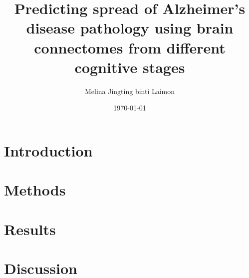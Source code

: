 \documentclass[11pt,a4paper]{article}
\title{Predicting spread of Alzheimer’s disease pathology using brain  connectomes from different cognitive stages}
\author{Melina Jingting binti Laimon}
\date{\today}
\begin{document}
\maketitle
\begin{abstract}
    
\end{abstract}

\section{Introduction}
\label{sec:Introduction}



\section{Methods}
\label{sec:Methods}




\section{Results}
\label{Results}



\section{Discussion}
\label{sec:Discussion}





\end{document}
